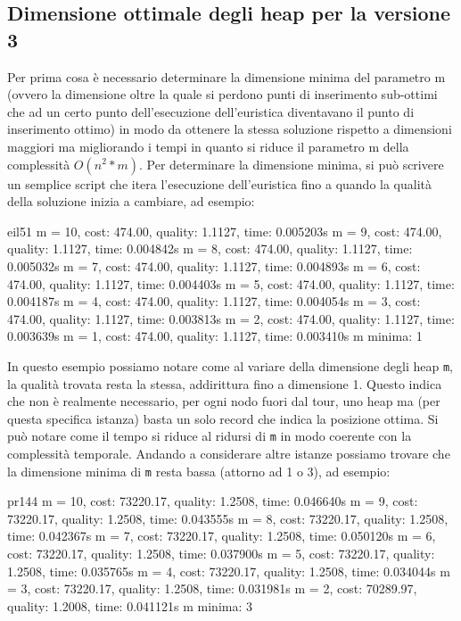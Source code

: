\documentclass[a4paper,12pt]{report}
\begin{document}
\subsection{Dimensione ottimale degli heap per la versione 3}
Per prima cosa è necessario determinare la dimensione minima del parametro m (ovvero la dimensione oltre la quale si perdono punti di inserimento sub-ottimi che ad un certo punto dell'esecuzione dell'euristica diventavano il punto di inserimento ottimo) in modo da ottenere la stessa soluzione rispetto a dimensioni maggiori ma migliorando i tempi in quanto si riduce il parametro m della complessità $O(n^2 * m)$. Per determinare la dimensione minima, si può scrivere un semplice script che itera l'esecuzione dell'euristica fino a quando la qualità della soluzione inizia a cambiare, ad esempio:
\begin{myverbatim}
eil51
m = 10, cost: 474.00, quality: 1.1127, time: 0.005203s
m = 9, cost: 474.00, quality: 1.1127, time: 0.004842s
m = 8, cost: 474.00, quality: 1.1127, time: 0.005032s
m = 7, cost: 474.00, quality: 1.1127, time: 0.004893s
m = 6, cost: 474.00, quality: 1.1127, time: 0.004403s
m = 5, cost: 474.00, quality: 1.1127, time: 0.004187s
m = 4, cost: 474.00, quality: 1.1127, time: 0.004054s
m = 3, cost: 474.00, quality: 1.1127, time: 0.003813s
m = 2, cost: 474.00, quality: 1.1127, time: 0.003639s
m = 1, cost: 474.00, quality: 1.1127, time: 0.003410s
m minima: 1
\end{myverbatim}
In questo esempio possiamo notare come al variare della dimensione degli heap \lstinline!m!, la qualità trovata resta la stessa, addirittura fino a dimensione 1. Questo indica che non è realmente necessario, per ogni nodo fuori dal tour, uno heap ma (per questa specifica istanza) basta un solo record che indica la posizione ottima. Si può notare come il tempo si riduce al ridursi di \lstinline!m! in modo coerente con la complessità temporale. \newline
Andando a considerare altre istanze possiamo trovare che la dimensione minima di \lstinline!m! resta bassa (attorno ad 1 o 3), ad esempio:
\begin{myverbatim}
pr144
m = 10, cost: 73220.17, quality: 1.2508, time: 0.046640s
m = 9, cost: 73220.17, quality: 1.2508, time: 0.043555s
m = 8, cost: 73220.17, quality: 1.2508, time: 0.042367s
m = 7, cost: 73220.17, quality: 1.2508, time: 0.050120s
m = 6, cost: 73220.17, quality: 1.2508, time: 0.037900s
m = 5, cost: 73220.17, quality: 1.2508, time: 0.035765s
m = 4, cost: 73220.17, quality: 1.2508, time: 0.034044s
m = 3, cost: 73220.17, quality: 1.2508, time: 0.031981s
m = 2, cost: 70289.97, quality: 1.2008, time: 0.041121s
m minima: 3
\end{myverbatim}
\end{document}
